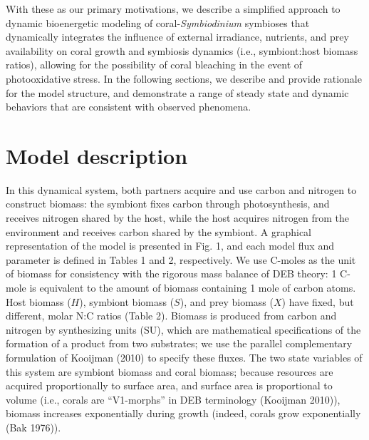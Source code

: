 \documentclass[]{elsarticle} %
\begin{document}
With these as our primary motivations, we describe a simplified approach
to dynamic bioenergetic modeling of coral-\emph{Symbiodinium} symbioses
that dynamically integrates the influence of external irradiance,
nutrients, and prey availability on coral growth and symbiosis dynamics
(i.e., symbiont:host biomass ratios), allowing for the possibility of
coral bleaching in the event of photooxidative stress. In the following
sections, we describe and provide rationale for the model structure, and
demonstrate a range of steady state and dynamic behaviors that are
consistent with observed phenomena.

\section{Model description}\label{model-description}

In this dynamical system, both partners acquire and use carbon and
nitrogen to construct biomass: the symbiont fixes carbon through
photosynthesis, and receives nitrogen shared by the host, while the host
acquires nitrogen from the environment and receives carbon shared by the
symbiont. A graphical representation of the model is presented in Fig.
1, and each model flux and parameter is defined in Tables 1 and 2,
respectively. We use C-moles as the unit of biomass for consistency with
the rigorous mass balance of DEB theory: 1 C-mole is equivalent to the
amount of biomass containing 1 mole of carbon atoms. Host biomass
(\(H\)), symbiont biomass (\(S\)), and prey biomass (\(X\)) have fixed,
but different, molar N:C ratios (Table 2). Biomass is produced from
carbon and nitrogen by synthesizing units (SU), which are mathematical
specifications of the formation of a product from two substrates; we use
the parallel complementary formulation of Kooijman (2010) to specify
these fluxes. The two state variables of this system are symbiont
biomass and coral biomass; because resources are acquired proportionally
to surface area, and surface area is proportional to volume (i.e.,
corals are ``V1-morphs'' in DEB terminology (Kooijman 2010)), biomass
increases exponentially during growth (indeed, corals grow exponentially
(Bak 1976)).
\end{document}
